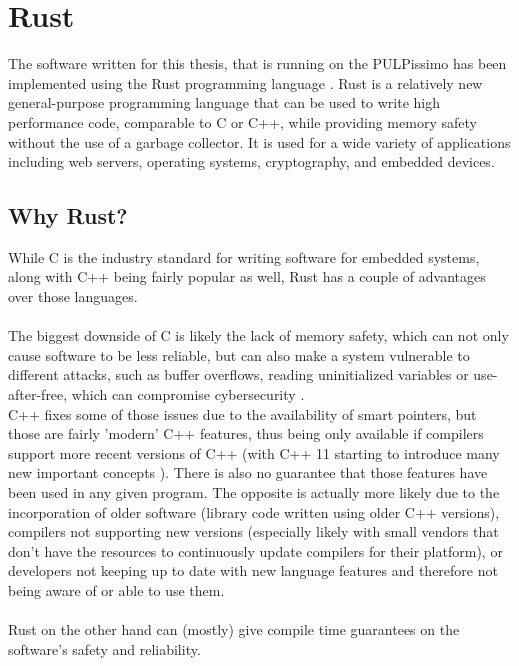\section{Rust}

The software written for this thesis, that is running on the PULPissimo \cite{pulpissimo} has been implemented using the Rust programming language \cite{rustlang}.
Rust is a relatively new general-purpose programming language that can be used to write high performance code, comparable
to C or C++, while providing memory safety without the use of a garbage collector.
It is used for a wide variety of applications including web servers, operating systems, cryptography, and embedded devices.

\subsection{Why Rust?}

While C is the industry standard for writing software for embedded systems, along with C++ being fairly popular as well, Rust has a couple of
advantages over those languages.\\\\
The biggest downside of C is likely the lack of memory safety, which can not only cause software to be less reliable, but
can also make a system vulnerable to different attacks, such as buffer overflows, reading uninitialized variables or use-after-free, which can compromise cybersecurity \cite{memory_safety}.\\
C++ fixes some of those issues due to the availability of smart pointers, but those are fairly 'modern' C++ features, thus being only available if compilers support more recent
versions of C++ (with C++ 11 starting to introduce many new important concepts \cite{cpp11}).
There is also no guarantee that those features have been used in any given program.
The opposite is actually more likely due to the incorporation of older software (library code written using older C++ versions),
compilers not supporting new versions (especially likely with small vendors that don't have the resources to continuously update compilers for their platform),
or developers not keeping up to date with new language features and therefore not being aware of or able to use them.\\\\
Rust on the other hand can (mostly) give compile time guarantees on the software's safety and reliability.

\raggedbottom
\newpage

